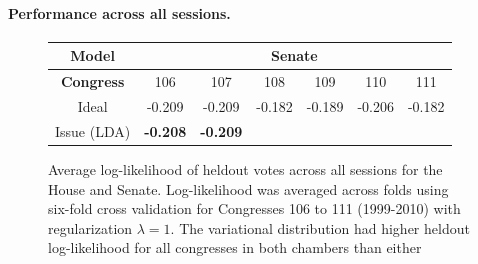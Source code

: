 \paragraph{Performance across all sessions.}

\begin{figure}
  \caption{Average log-likelihood of heldout votes across all sessions
    for the House and Senate.  Log-likelihood was averaged across
    folds using six-fold cross validation for Congresses 106 to 111
    (1999-2010) with regularization $\lambda=1$.  The variational
    distribution had higher heldout log-likelihood for all congresses
    in both chambers than either } \center
  \begin{tabular}{|c|cccccc|}
    \hline
    \textbf{Model} & \multicolumn{6}{|c|}{\textbf{Senate}} \\
    \hline
    \textbf{Congress} & \hspace{-4pt} 106 \hspace{-5pt}
    & \hspace{-4pt} 107 \hspace{-5pt}
    & \hspace{-4pt} 108 \hspace{-5pt}
    & \hspace{-4pt} 109 \hspace{-5pt}
    & \hspace{-4pt} 110 \hspace{-5pt}
    & \hspace{-4pt} 111 \hspace{-4pt} \\
    \hline
    Ideal
    & \hspace{-4pt} -0.209 \hspace{-5pt}
    & \hspace{-4pt} -0.209 \hspace{-5pt}
    & \hspace{-4pt} -0.182 \hspace{-5pt}
    & \hspace{-4pt} -0.189 \hspace{-5pt}
    & \hspace{-4pt} -0.206 \hspace{-5pt}
    & \hspace{-4pt} -0.182 \hspace{-4pt} \\
    Issue (LDA)
    & \hspace{-4pt} \textbf{-0.208} \hspace{-5pt}
    & \hspace{-4pt} \textbf{-0.209} \hspace{-5pt}

\end{tabular}
\end{figure}
